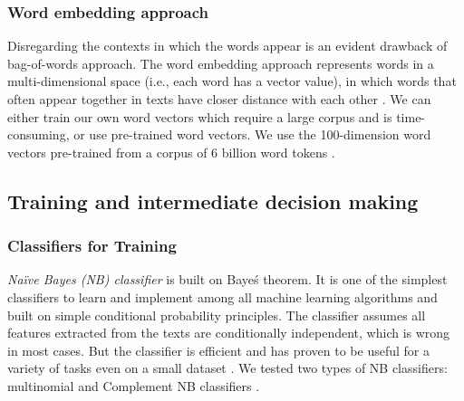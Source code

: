 \documentclass[11pt]{article}
\begin{document}
\subsubsection{Word embedding approach}

Disregarding the contexts in which the words appear is an evident drawback of bag-of-words approach. The word embedding approach represents words in a multi-dimensional space (i.e., each word has a vector value), in which words that often appear together in texts have closer distance with each other \parencites[][290]{JurafskySpeechLanguageProcessing2017}[][65]{BengfortAppliedTextAnalysis2018}. We can either train our own word vectors which require a large corpus and is time-consuming, or use pre-trained word vectors. We use the 100-dimension word vectors pre-trained from a corpus of 6 billion word tokens \parencite{PenningtonGloveGlobalVectors2014}.


\subsection{Training and intermediate decision making}

\subsubsection{Classifiers for Training}

\textit{Na\"ive Bayes (NB) classifier} is built on Baye\'s theorem. It is one of the simplest classifiers to learn and implement among all machine learning algorithms and built on simple conditional probability principles. The classifier assumes all features extracted from the texts are conditionally independent, which is wrong in most cases. But the classifier is efficient and has proven to be useful for a variety of tasks even on a small dataset \parencites[][76]{JurafskySpeechLanguageProcessing2017}[][277]{GrimmerTextDataPromise2013}. We tested two types of NB classifiers: multinomial and Complement NB classifiers \parencite{RennieTacklingPoorAssumptions2003}.


\end{document}
